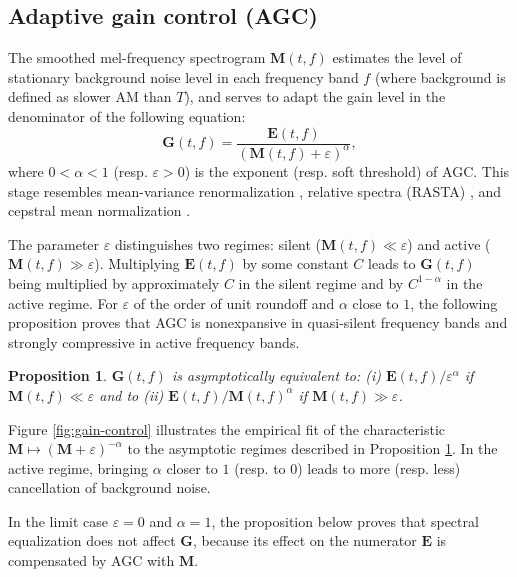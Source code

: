 \documentclass[journal]{IEEEtran}
\makeatletter
\newcommand*{\resp}{resp.\@\xspace}
\newtheorem{prop}[thm]{Proposition}
\theoremstyle{remark}
\makeatother
\begin{document}
\subsection{Adaptive gain control (AGC)}
The smoothed mel-frequency spectrogram $\mathbf{M}(t,f)$ estimates the level of stationary background noise level in each frequency band $f$ (where background is defined as slower AM than $T$), and serves to adapt the gain level in the denominator of the following equation:
\begin{equation}
\mathbf{G}(t,f) = \dfrac{ \mathbf{E}(t,f) }{ (\mathbf{M}(t,f)+\varepsilon)^\alpha},
\label{eq:gain-control}
\end{equation}
where $0 < \alpha < 1$ (\resp{} $\varepsilon > 0$) is the exponent (\resp{} soft threshold) of AGC.
This stage resembles mean-variance renormalization \cite{chen2007taslp}, relative spectra (RASTA) \cite{hermansky1994tsap}, and cepstral mean normalization \cite{atal1974jasa}. 

The parameter $\varepsilon$ distinguishes two regimes: silent ($\mathbf{M}(t,f) \ll \varepsilon$) and active ($\mathbf{M}(t,f) \gg \varepsilon$).
Multiplying $\mathbf{E}(t,f)$ by some constant $C$ leads to $\mathbf{G}(t,f)$ being multiplied by approximately $C$ in the silent regime and by $C^{1-\alpha}$ in the active regime.
For $\varepsilon$ of the order of unit roundoff and $\alpha$ close to $1$, the following proposition proves that AGC is nonexpansive in quasi-silent frequency bands and strongly compressive in active frequency bands.

\begin{prop}
$\mathbf{G}(t,f)$ is asymptotically equivalent to: (i) $\mathbf{E}(t,f) / \varepsilon^\alpha$ if $\mathbf{M}(t,f) \ll \varepsilon$ and to (ii) $\mathbf{E}(t,f) / \mathbf{M}(t,f)^\alpha$ if $\mathbf{M}(t,f) \gg \varepsilon$.
\label{prop:gain-control}
\end{prop}

Figure \ref{fig:gain-control} illustrates the empirical fit of the characteristic $\mathbf{M} \mapsto (\mathbf{M}+\varepsilon)^{-\alpha}$ to the asymptotic regimes described in Proposition \ref{prop:gain-control}.
In the active regime, bringing $\alpha$ closer to $1$ (\resp{} to $0$) leads to more (\resp{} less) cancellation of background noise.

In the limit case $\varepsilon = 0$ and $\alpha = 1$, the proposition below proves that spectral equalization does not affect $\mathbf{G}$, because its effect on the numerator $\mathbf{E}$ is compensated by AGC with $\mathbf{M}$.
\end{document}
